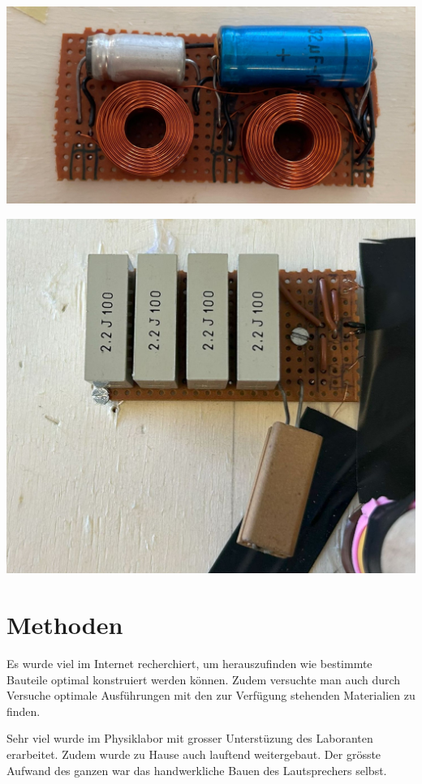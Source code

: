 \documentclass[a4paper,11pt]{report}
\begin{document}
\begin{minipage}{0.5\textwidth}
    \centering
    \includegraphics[width=.8\linewidth]{resources/images/Fotos/Physik-138.jpg}
    \label{fig:weiche}
\end{minipage}
\begin{minipage}{0.5\textwidth}
    \centering
    \includegraphics[width=.8\linewidth]{resources/images/Fotos/Physik-127.jpg}
    \label{fig:filter}
\end{minipage}

\newpage
\section{Methoden}
Es wurde viel im Internet recherchiert, um herauszufinden wie bestimmte Bauteile optimal konstruiert werden können. Zudem versuchte man auch durch Versuche optimale Ausführungen mit den zur Verfügung stehenden Materialien zu finden.

Sehr viel wurde im Physiklabor mit grosser Unterstüzung des Laboranten erarbeitet. Zudem wurde zu Hause auch lauftend weitergebaut. Der grösste Aufwand des ganzen war das handwerkliche Bauen des Lautsprechers selbst.
\end{document}
